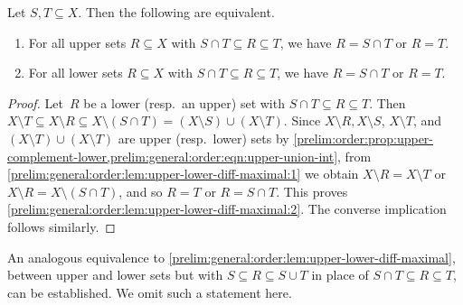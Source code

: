 \begin{lemma}\label{prelim:general:order:lem:upper-lower-diff-maximal}
	Let $S,T \subseteq X$.
	Then the following are equivalent.
\begin{enumerate}
	  \item \label{prelim:general:order:lem:upper-lower-diff-maximal:1} For all upper sets $R \subseteq X$ with $S \cap T \subseteq R \subseteq T$, we have $R = S \cap T$ or $R = T$.
	
	\item \label{prelim:general:order:lem:upper-lower-diff-maximal:2} For all lower sets $R \subseteq X$ with $S \cap T \subseteq R \subseteq T$, 
	we have $R = S \cap T$ or $R = T$.    	
\end{enumerate}	 	
\end{lemma}
\begin{proof}
	Let~$R$ be a lower (resp.~an upper) set
	with $S\cap T \subseteq R \subseteq T$.
	Then $X \setminus T \subseteq X \setminus R \subseteq X \setminus (S \cap T) = (X \setminus S) \cup (X \setminus T)$.
	Since $X \setminus R, X\setminus S$, $X \setminus T$,
	and $( X\setminus T ) \cup (X \setminus T)$ 
	are upper (resp.~lower) sets by \cref{prelim:order:prop:upper-complement-lower,prelim:general:order:eqn:upper-union-int},
	from \cref{prelim:general:order:lem:upper-lower-diff-maximal:1}
	we obtain $X \setminus R = X \setminus T$
	or $X \setminus R = X \setminus ( S \cap T )$,
	and so $R = T$ or $R = S \cap T$.
    This proves \cref{prelim:general:order:lem:upper-lower-diff-maximal:2}.
    The converse implication follows similarly.
 \end{proof}

An analogous equivalence to \cref{prelim:general:order:lem:upper-lower-diff-maximal}, between upper and lower sets but with $S \subseteq R \subseteq S \cup T$ in place of $S \cap T \subseteq R \subseteq T$, can be established. We omit such a statement here.

